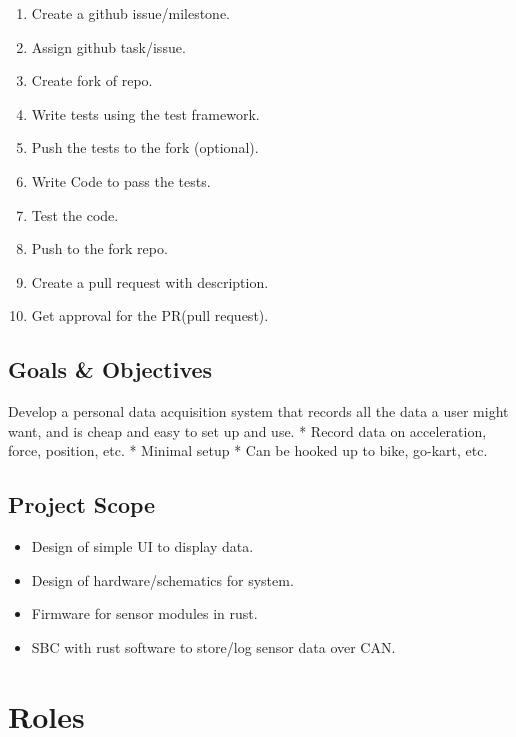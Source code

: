 \begin{enumerate}
\def\labelenumi{\arabic{enumi}.}
\tightlist
\item
  Create a github issue/milestone.
\item
  Assign github task/issue.
\item
  Create fork of repo.
\item
  Write tests using the test framework.
\item
  Push the tests to the fork (optional).
\item
  Write Code to pass the tests.
\item
  Test the code.
\item
  Push to the fork repo.
\item
  Create a pull request with description.
\item
  Get approval for the PR(pull request).
\end{enumerate}

\hypertarget{goals-objectives}{%
\subsection{Goals \& Objectives}\label{goals-objectives}}

Develop a personal data acquisition system that records all the data a
user might want, and is cheap and easy to set up and use. * Record data
on acceleration, force, position, etc. * Minimal setup * Can be hooked
up to bike, go-kart, etc.

\hypertarget{project-scope}{%
\subsection{Project Scope}\label{project-scope}}

\begin{itemize}
\tightlist
\item
  Design of simple UI to display data.
\item
  Design of hardware/schematics for system.
\item
  Firmware for sensor modules in rust.
\item
  SBC with rust software to store/log sensor data over CAN.
\end{itemize}

\hypertarget{roles}{%
\section{Roles}\label{roles}}

